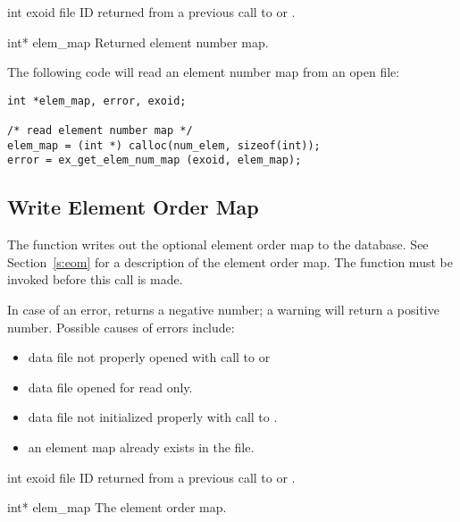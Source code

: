 
\begin{parameters}
\item[{int exoid \R{}}]
\exo{} file ID returned from a previous call to  or
.

\item[{int* elem_map \W{}}]
Returned element number map.
\end{parameters}

The following code will read an element number map from an 
open \exo{} file:
\begin{lstlisting}
int *elem_map, error, exoid;

/* read element number map */
elem_map = (int *) calloc(num_elem, sizeof(int));
error = ex_get_elem_num_map (exoid, elem_map);
\end{lstlisting}

\subsection{Write Element Order Map}

The function  writes out the optional element
order map to the database. See Section~\ref{s:eom} for a description
of the element order map. The function  must be
invoked before this call is made.

In case of an error,  returns a negative 
number; a warning will return a positive number. 
Possible causes of errors include:

\begin{itemize}
 \item data file not properly opened with call to 
 or 

 \item data file opened for read only.

 \item data file not initialized properly with call to
 .

 \item an element map already exists in the file.
\end{itemize}



\begin{parameters}
\item[{int exoid \R{}}]
\exo{} file ID returned from a previous call to  
or .

\item[{int* elem_map \R{}}]
The element order map.
\end{parameters}

